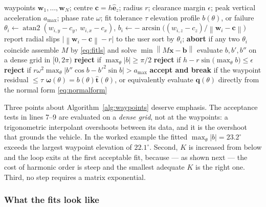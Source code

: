 \documentclass[11pt,a4paper]{article}
\newcommand{\ez}{\hat{\bm{e}}_z}
\newcommand{\q}{\bm{q}}
\newcommand{\cv}{\bm{c}}
\newcommand{\norm}[1]{\left\lVert#1\right\rVert}
\newcommand{\that}{\hat{\bm{t}}}
\begin{document}
\begin{algorithm}[htbp]
\caption{Elevation profile from waypoints}
\label{alg:waypoints}
\begin{algorithmic}[1]
\Require waypoints $\bm w_1,\dots,\bm w_N$; centre $\cv=h\ez$; radius $r$;
         clearance margin $\epsilon$; peak vertical acceleration $a_{\max}$;
         phase rate $\omega$; fit tolerance $\tau$
\Ensure  elevation profile $b(\theta)$, or failure
\State $\theta_i \gets \operatorname{atan2}(w_{i,y}-c_y,\ w_{i,x}-c_x)$,\quad
       $b_i \gets -\arcsin\!\big((w_{i,z}-c_z)/\norm{\bm w_i-\cv}\big)$ 
\State report radial slips $\big|\norm{\bm w_i-\cv}-r\big|$ to the user
\State sort by $\theta_i$; \textbf{abort} if any two $\theta_i$ coincide 
  \State assemble $M$ by \eqref{eq:fitls} and solve $\min\norm{M\bm x-\bm b}$
  \State evaluate $b,b',b''$ on a dense grid in $[0,2\pi)$
  \State \textbf{reject} if $\max_\theta|b| \ge \pi/2$ 
  \State \textbf{reject} if $h - r\sin\big(\max_\theta b\big) \le \epsilon$ 
  \State \textbf{reject} if $r\omega^2\max_\theta\big|b''\cos b - b'^2\sin b\big| > a_{\max}$ 
  \State \textbf{accept and break} if the waypoint residual $\le \tau$
\EndFor
\State \Return $\bm\omega(\theta) = b(\theta)\that(\theta)$, or equivalently evaluate
       $\q(\theta)$ directly from the normal form \eqref{eq:normalform}
\end{algorithmic}
\end{algorithm}

Three points about Algorithm~\ref{alg:waypoints} deserve emphasis. The
acceptance tests in lines 7--9 are evaluated on a \emph{dense grid}, not at the
waypoints: a trigonometric interpolant overshoots between its data, and it is
the overshoot that grounds the vehicle. In the worked example the fitted
$\max_\theta|b| = 23.2^\circ$ exceeds the largest waypoint elevation of
$22.1^\circ$. Second, $K$ is increased from below and the loop exits at the
first acceptable fit, because --- as shown next --- the cost of harmonic order
is steep and the smallest adequate $K$ is the right one. Third, no step
requires a matrix exponential.

\subsubsection*{What the fits look like}
\end{document}
